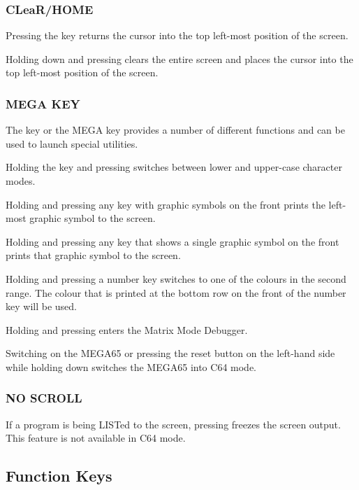 \subsubsection{CLeaR/HOME}

Pressing the  key returns the cursor into the top left-most position of the screen.

Holding down  and pressing  clears the entire screen and places the cursor into the top left-most position of the screen.

\subsubsection{MEGA KEY}

The \megasymbolkey key or the MEGA key provides a number of different functions and can be used to launch special utilities.

Holding the  key and pressing \megasymbolkey switches between lower and upper-case character modes.

Holding \megasymbolkey and pressing any key with graphic symbols on the front prints the left-most graphic symbol to the screen.

Holding \megasymbolkey and pressing any key that shows a single graphic symbol on the front prints that graphic symbol to the screen.

Holding \megasymbolkey and pressing a number key switches to one of the colours in the second range. The colour that is printed at the bottom row on the front of the number key will be used.

Holding \megasymbolkey and pressing  enters the Matrix Mode Debugger.

Switching on the MEGA65 or pressing the reset button on the left-hand side while holding down \megasymbolkey switches the MEGA65 into C64 mode.

\subsubsection{NO SCROLL}
If a program is being LISTed to the screen, pressing  freezes the screen output. This feature is not available in C64 mode.


\subsection{Function Keys}

